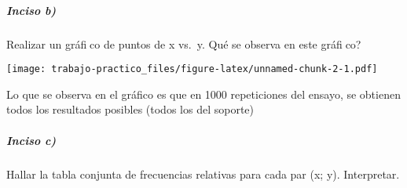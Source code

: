 \documentclass[
]{article}
\newenvironment{Shaded}{\begin{snugshade}}{\end{snugshade}}
\newcommand{\AttributeTok}[1]{\textcolor[rgb]{0.77,0.63,0.00}{#1}}
\newcommand{\DecValTok}[1]{\textcolor[rgb]{0.00,0.00,0.81}{#1}}
\newcommand{\FunctionTok}[1]{\textcolor[rgb]{0.00,0.00,0.00}{#1}}
\newcommand{\NormalTok}[1]{#1}
\newcommand{\SpecialCharTok}[1]{\textcolor[rgb]{0.00,0.00,0.00}{#1}}
\newcommand{\StringTok}[1]{\textcolor[rgb]{0.31,0.60,0.02}{#1}}
\begin{document}
\hypertarget{inciso-b}{%
\subparagraph{Inciso b)}\label{inciso-b}}

Realizar un gráfico de puntos de x vs.~y. Qué se observa en este
gráfico?

\begin{Shaded}
\end{Shaded}

\texttt{[image: trabajo-practico\_files/figure-latex/unnamed-chunk-2-1.pdf]}

Lo que se observa en el gráfico es que en 1000 repeticiones del ensayo,
se obtienen todos los resultados posibles (todos los del soporte)

\hypertarget{inciso-c}{%
\subparagraph{Inciso c)}\label{inciso-c}}

Hallar la tabla conjunta de frecuencias relativas para cada par (x; y).
Interpretar.
\end{document}
